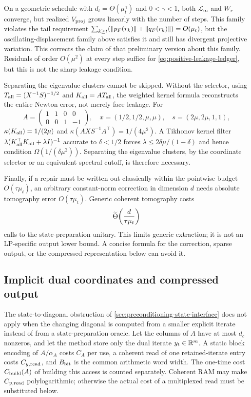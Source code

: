 On a geometric schedule with
$d_t=\Theta(\mu_t^\gamma)$ and $0<\gamma<1$, both
$\mathcal L_\infty$ and $W_r$ converge, but realized $V_{\rm proj}$ grows
linearly with the number of steps.  This family violates the tail
requirement $\sum_{k\geq t}(\lVert p_F(r_k)\rVert+\lVert q_F(r_k)\rVert)=O(\mu_t)$, but
the oscillating-displacement family above satisfies it and still has divergent
projective variation.  This corrects the claim of that preliminary version
about this family.  Residuals of order $O(\mu^2)$ at every step suffice for
\eqref{eq:positive-leakage-ledger}, but this is not the sharp leakage
condition.

Separating the eigenvalue clusters cannot be skipped.  Without the selector, using
$T_{\rm all}=(X^{-1}S)^{-1/2}$ and $K_{\rm all}=AT_{\rm all}$, the weighted
kernel formula reconstructs the entire Newton error, not merely face leakage.
For
\[
 A=\begin{pmatrix}1&1&0&0\\0&0&1&-1\end{pmatrix},\quad
 x=(1/2,1/2,\mu,\mu),\quad s=(2\mu,2\mu,1,1),
\]
$\kappa(K_{\rm all})=1/(2\mu)$ and
$\kappa(AXS^{-1}A^\top)=1/(4\mu^2)$.  A Tikhonov kernel filter
$\lambda(K_{\rm all}^\top K_{\rm all}+\lambda I)^{-1}$ accurate to $\delta<1/2$
forces $\lambda\leq2\delta\mu/(1-\delta)$ and hence condition
$\Omega(1/(\delta\mu^2))$.  Separating the eigenvalue clusters, by the
coordinate selector or an equivalent spectral cutoff, is therefore necessary.

Finally, if a repair must be written out classically within the pointwise
budget $O(\tau\mu_t)$, an arbitrary constant-norm correction in dimension $d$
needs absolute tomography error $O(\tau\mu_t)$.  Generic coherent tomography
costs
\begin{equation}
 \widetilde{\Theta}\!\left(\frac{d}{\tau\mu_t}\right)          \label{eq:positive-face-tomography}
\end{equation}
calls to the state-preparation unitary.  This limits generic extraction; it
is not an LP-specific output lower bound.  A concise formula for the
correction, sparse output, or the compressed representation below can avoid
it.

\subsection{Implicit dual coordinates and compressed output}
\label{sec:positive-compressed-dual}

The state-to-diagonal obstruction of
\cref{sec:preconditioning-state-interface} does not apply when the changing
diagonal is computed from a smaller explicit iterate instead of from a
state-preparation oracle.  Let the columns of $A$ have at most $d_c$ nonzeros,
and let the method store only the dual iterate $y_t\in\mathbb{R}^m$.  A static block
encoding of $A/\alpha_A$ costs $C_A$ per use, a coherent read of one
retained-iterate entry costs $C_{y,{\rm read}}$, and $B_{\rm bit}$ is the
common arithmetic word width.  The one-time cost $C_{\rm build}(A)$ of building
this access is counted separately.  Coherent RAM may make $C_{y,{\rm read}}$
polylogarithmic; otherwise the actual cost of a multiplexed read must be
substituted below.

